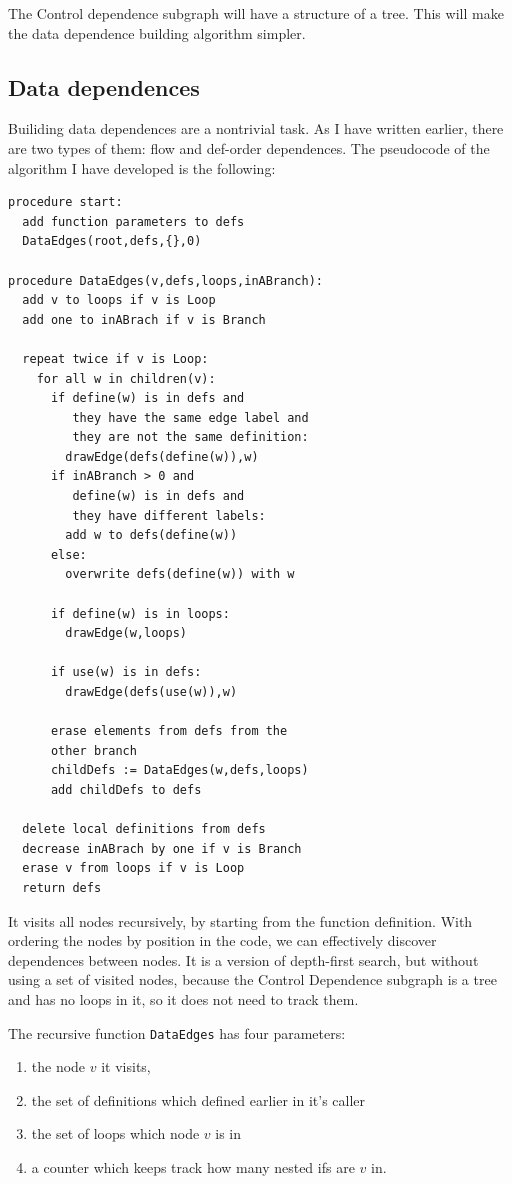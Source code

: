 \documentclass[oneside,12pt,a4paper]{book}
\begin{document}
The Control dependence subgraph will have a structure of a tree. This will make the data dependence building algorithm simpler. 

\subsection{Data dependences}
Builiding data dependences are a nontrivial task. As I have written earlier, there are two types of them: flow and def-order dependences. The pseudocode of the algorithm I have developed is the following:
\clearpage
\lstset{numbers=left}
\begin{lstlisting}
procedure start:
  add function parameters to defs
  DataEdges(root,defs,{},0)

procedure DataEdges(v,defs,loops,inABranch):
  add v to loops if v is Loop
  add one to inABrach if v is Branch

  repeat twice if v is Loop:
    for all w in children(v):
      if define(w) is in defs and
         they have the same edge label and
         they are not the same definition:
        drawEdge(defs(define(w)),w)
      if inABranch > 0 and
         define(w) is in defs and
         they have different labels:
        add w to defs(define(w))
      else:
        overwrite defs(define(w)) with w
            
      if define(w) is in loops:
        drawEdge(w,loops)

      if use(w) is in defs:
        drawEdge(defs(use(w)),w)

      erase elements from defs from the 
      other branch
      childDefs := DataEdges(w,defs,loops)
      add childDefs to defs

  delete local definitions from defs
  decrease inABrach by one if v is Branch
  erase v from loops if v is Loop
  return defs
\end{lstlisting}

It visits all nodes recursively, by starting from the function definition. With ordering the nodes by position in the code, we can effectively discover dependences between nodes. It is a version of depth-first search, but without using a set of visited nodes, because the Control Dependence subgraph is a tree and has no loops in it, so it does not need to track them. 

The recursive function \texttt{DataEdges} has four parameters:
\begin{enumerate}
\item the node $v$ it visits,
\item the set of definitions which defined earlier in it's caller
\item the set of loops which node $v$ is in
\item a counter which keeps track how many nested ifs are $v$ in.
\end{enumerate}
\end{document}
